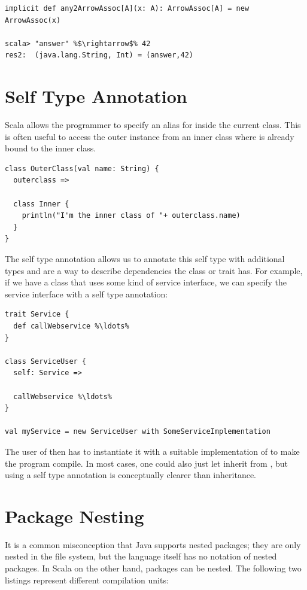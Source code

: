 \documentclass[10pt,a4paper,oneside]{scrreprt}
\begin{document}
{\begin{lstlisting}
implicit def any2ArrowAssoc[A](x: A): ArrowAssoc[A] = new ArrowAssoc(x)

scala> "answer" %$\rightarrow$% 42
res2:  (java.lang.String, Int) = (answer,42)
\end{lstlisting}

\section{Self Type Annotation} \label{section:self-type-annotation}

Scala allows the programmer to specify an alias for  inside the current class. This is often useful to access the outer instance from an inner class where  is already bound to the inner class. 

\begin{lstlisting}
class OuterClass(val name: String) {
  outerclass =>

  class Inner {
    println("I'm the inner class of "+ outerclass.name)
  }
}
\end{lstlisting}

The self type annotation allows us to annotate this self type with additional types and are a way to describe dependencies the class or trait has. For example, if we have a class that uses some kind of service interface, we can specify the service interface with a self type annotation:

\begin{lstlisting}
trait Service {
  def callWebservice %\ldots%
}

class ServiceUser {
  self: Service =>

  callWebservice %\ldots%
}

val myService = new ServiceUser with SomeServiceImplementation
\end{lstlisting}

The user of  then has to instantiate it with a suitable implementation of  to make the program compile. In most cases, one could also just let  inherit from , but using a self type annotation is conceptually clearer than inheritance.


\section{Package Nesting} \label{section:package-nesting}

It is a common misconception that Java supports nested packages; they are only nested in the file system, but the language itself has no notation of nested packages. In Scala on the other hand, packages can be nested. The following two listings represent different compilation units:

}
\end{document}
